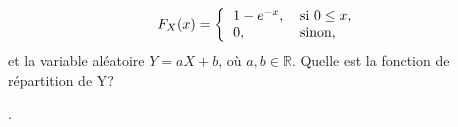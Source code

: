 \begin{questions}
\begin{align*}
F_X(x)= \left\{
\begin{tabular}{l l}
$1- e^{-x}$,&\mbox{si $0\leq x$},\\
$0$,& \mbox{sinon},
\end{tabular}
\right.
\end{align*}
et la variable aléatoire $Y=aX+b$, où $a,b\in\mathbb{R}$.
Quelle est la fonction de répartition de Y?



\end{questions}
\newpage
.


 
